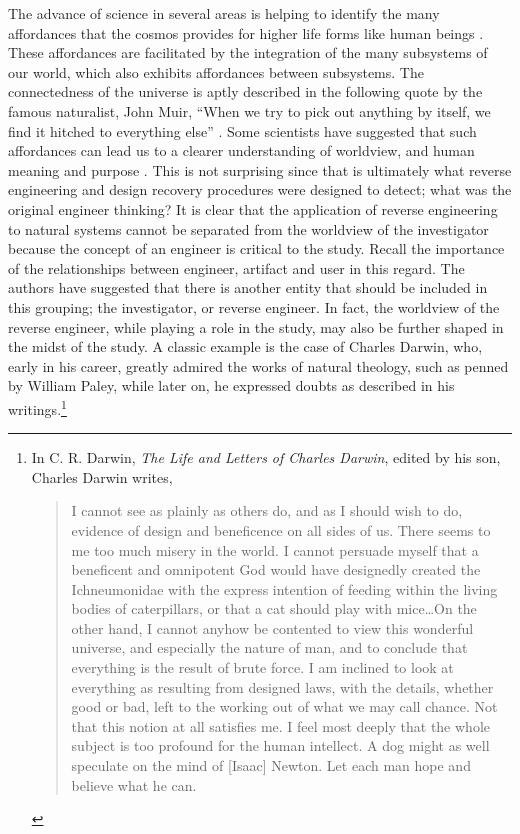 The advance of science in several areas is helping to identify the many
affordances that the cosmos provides for higher life forms like human
beings \citep{barrow2008}. These affordances are facilitated by the
integration of the many subsystems of our world, which also exhibits
affordances between subsystems. The connectedness of the universe is
aptly described in the following quote by the famous naturalist, John
Muir, “When we try to pick out anything by itself, we find it hitched
to everything else” \citep[][p.~110]{muir1988}. Some scientists have suggested
that such affordances can lead us to a clearer understanding of
worldview, and human meaning and purpose \citep{denton1998}. This is
not surprising since that is ultimately what reverse engineering and
design recovery procedures were designed to detect; what was the
original engineer thinking? It is clear that the application of reverse
engineering to natural systems cannot be separated from the worldview
of the investigator because the concept of an engineer is critical to
the study. Recall the importance of the relationships between engineer,
artifact and user in this regard. The authors have suggested that there
is another entity that should be included in this grouping; the
investigator, or reverse engineer. In fact, the worldview of the
reverse engineer, while playing a role in the study, may also be
further shaped in the midst of the study. A classic example is the case
of Charles Darwin, who, early in his career, greatly admired the works
of natural theology, such as penned by William Paley, while later on,
he expressed doubts as described in his writings.\footnote{
In C. R. Darwin, \textit{The Life and Letters of
Charles Darwin}, edited by his son, Charles Darwin writes, 

\begin{quote}
I cannot see as plainly as others do,
and as I should wish to do, evidence of design and beneficence on all
sides of us. There seems to me too much misery in the world.  I cannot
persuade myself that a beneficent and omnipotent God would have
designedly created the Ichneumonidae with the express intention of
feeding within the living bodies of caterpillars, or that a cat should
play with mice…On the other hand, I cannot anyhow be contented to view
this wonderful universe, and especially the nature of man, and to
conclude that everything is the result of brute force. I am inclined to
look at everything as resulting from designed laws, with the details,
whether good or bad, left to the working out of what we may call
chance. Not that this notion at all satisfies me. I feel most deeply
that the whole subject is too profound for the human intellect. A dog
might as well speculate on the mind of [Isaac] Newton. Let each man
hope and believe what he can. \citep[][p.~312]{darwinll} %
\end{quote}
}

